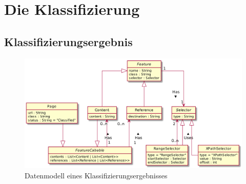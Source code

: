 \section{Die Klassifizierung}
    \label{section:conceptClassification}
    \subsection{Klassifizierungsergebnis}
        \begin{figure}[htb]
            \centering
            \includegraphics[width=\textwidth]{../resources/concept/page.png}
            \caption{Datenmodell eines Klassifizierungsergebnisses}
            \label{image:conceptPageDataModel}
        \end{figure}